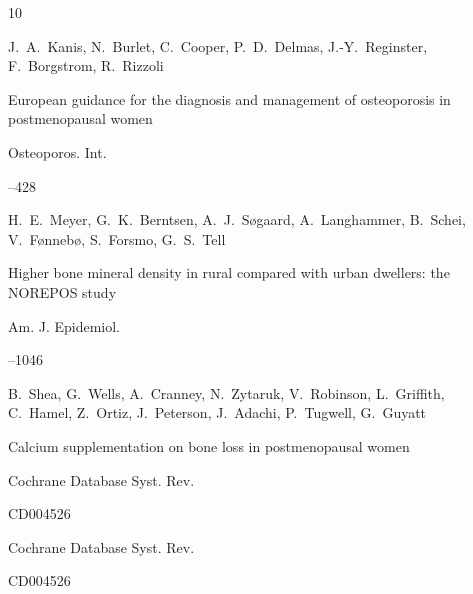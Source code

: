 \begin{thebibliography}{10}




\by	J.~A.~Kanis, N.~Burlet,  C.~Cooper,  P.~D.~Delmas,  J.-Y.~Reginster,  F.~Borgstrom,  R.~Rizzoli

\paper European guidance for the diagnosis and management of osteoporosis in postmenopausal women

\jour Osteoporos. Int.




--428











\by H.~E.~Meyer, G.~K.~Berntsen, A.~J.~S{\o}gaard, A.~Langhammer, B.~Schei,  V.~F{\o}nneb{\o}, S.~Forsmo, G.~S.~Tell

\paper Higher bone mineral density in rural compared with urban dwellers: the NOREPOS study

\jour Am. J. Epidemiol.




--1046






\by B.~Shea, G.~Wells, A.~Cranney, N.~Zytaruk, V.~Robinson, L.~Griffith, C.~Hamel, Z.~Ortiz, J.~Peterson, J.~Adachi, P.~Tugwell, G.~Guyatt

\paper Calcium supplementation on bone loss in postmenopausal women

\jour Cochrane Database Syst. Rev.



\papernumber CD004526

\moreref 

\jour Cochrane Database Syst. Rev.



\papernumber CD004526










\end{thebibliography}
